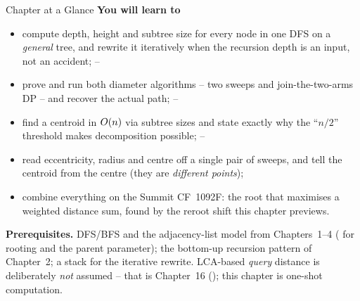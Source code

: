 \begin{chaptertheorybox}{Chapter at a Glance}
\textbf{You will learn to}
\begin{itemize}[nosep]
  \item compute depth, height and subtree size for every node in one DFS on a
        \emph{general} tree, and rewrite it iteratively when the recursion depth
        is an input, not an accident; \hfill{}--
  \item prove and run both diameter algorithms -- two sweeps and
        join-the-two-arms DP -- and recover the actual path; \hfill{}--
  \item find a centroid in $O(n)$ via subtree sizes and state exactly why the
        ``$n/2$'' threshold makes decomposition possible; \hfill{}--
  \item read eccentricity, radius and centre off a single pair of sweeps, and
        tell the centroid from the centre (they are \emph{different points}); \hfill{}
  \item combine everything on the Summit CF~1092F: the root that maximises a
        weighted distance sum, found by the reroot shift this chapter previews. \hfill{}
\end{itemize}

\textbf{Prerequisites.} DFS/BFS and the adjacency-list model from
Chapters~1--4 ( for rooting and the parent parameter); the bottom-up
recursion pattern of Chapter~2; a stack for the iterative rewrite. LCA-based
\emph{query} distance is deliberately \emph{not} assumed -- that is Chapter~16
(); this chapter is one-shot computation.
\end{chaptertheorybox}

